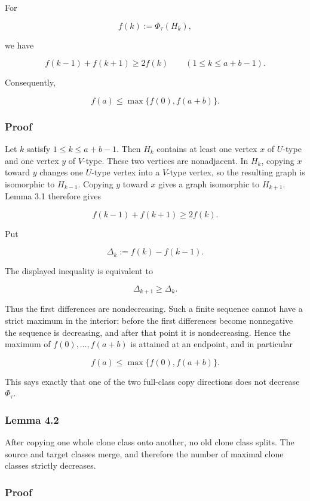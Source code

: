 \documentclass[
  11pt,
]{article}
\begin{document}
For

\[
f(k):=\Phi_\tau(H_k),
\]

we have

\[
f(k-1)+f(k+1)\ge2f(k)
\qquad
(1\le k\le a+b-1).
\]

Consequently,

\[
f(a)\le\max\{f(0),f(a+b)\}.
\]

\subsubsection{Proof}\label{proof-2}

Let \(k\) satisfy \(1\le k\le a+b-1\). Then \(H_k\) contains at least
one vertex \(x\) of \(U\)-type and one vertex \(y\) of \(V\)-type. These
two vertices are nonadjacent. In \(H_k\), copying \(x\) toward \(y\)
changes one \(U\)-type vertex into a \(V\)-type vertex, so the resulting
graph is isomorphic to \(H_{k-1}\). Copying \(y\) toward \(x\) gives a
graph isomorphic to \(H_{k+1}\). Lemma 3.1 therefore gives

\[
f(k-1)+f(k+1)\ge2f(k).
\]

Put

\[
\Delta_k:=f(k)-f(k-1).
\]

The displayed inequality is equivalent to

\[
\Delta_{k+1}\ge\Delta_k.
\]

Thus the first differences are nondecreasing. Such a finite sequence
cannot have a strict maximum in the interior: before the first
differences become nonnegative the sequence is decreasing, and after
that point it is nondecreasing. Hence the maximum of
\(f(0),\ldots,f(a+b)\) is attained at an endpoint, and in particular

\[
f(a)\le\max\{f(0),f(a+b)\}.
\]

This says exactly that one of the two full-class copy directions does
not decrease \(\Phi_\tau\).

\subsubsection{Lemma 4.2}\label{lemma-4.2}

After copying one whole clone class onto another, no old clone class
splits. The source and target classes merge, and therefore the number of
maximal clone classes strictly decreases.

\subsubsection{Proof}\label{proof-3}
\end{document}
